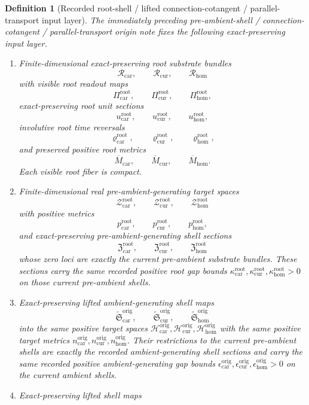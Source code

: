 \documentclass[11pt]{article}
\newcommand{\TensorOriginTarget}{\mathcal H_{\mathrm{car}}^{\mathrm{orig}}}
\newcommand{\CurOriginTarget}{\mathcal H_{\mathrm{cur}}^{\mathrm{orig}}}
\newcommand{\HomOriginTarget}{\mathcal H_{\mathrm{hom}}^{\mathrm{orig}}}
\newcommand{\TensorOriginTargetMetric}{n_{\mathrm{car}}^{\mathrm{orig}}}
\newcommand{\CurOriginTargetMetric}{n_{\mathrm{cur}}^{\mathrm{orig}}}
\newcommand{\HomOriginTargetMetric}{n_{\mathrm{hom}}^{\mathrm{orig}}}
\newcommand{\TensorOriginGap}{\epsilon_{\mathrm{car}}^{\mathrm{orig}}}
\newcommand{\CurOriginGap}{\epsilon_{\mathrm{cur}}^{\mathrm{orig}}}
\newcommand{\HomOriginGap}{\epsilon_{\mathrm{hom}}^{\mathrm{orig}}}
\newcommand{\TensorRootSpace}{\mathcal R_{\mathrm{car}}}
\newcommand{\CurRootSpace}{\mathcal R_{\mathrm{cur}}}
\newcommand{\HomRootSpace}{\mathcal R_{\mathrm{hom}}}
\newcommand{\TensorRootRead}{\Pi_{\mathrm{car}}^{\mathrm{root}}}
\newcommand{\CurRootRead}{\Pi_{\mathrm{cur}}^{\mathrm{root}}}
\newcommand{\HomRootRead}{\Pi_{\mathrm{hom}}^{\mathrm{root}}}
\newcommand{\TensorRootUnit}{u_{\mathrm{car}}^{\mathrm{root}}}
\newcommand{\CurRootUnit}{u_{\mathrm{cur}}^{\mathrm{root}}}
\newcommand{\HomRootUnit}{u_{\mathrm{hom}}^{\mathrm{root}}}
\newcommand{\TensorRootTimeRev}{\varrho_{\mathrm{car}}^{\mathrm{root}}}
\newcommand{\CurRootTimeRev}{\varrho_{\mathrm{cur}}^{\mathrm{root}}}
\newcommand{\HomRootTimeRev}{\varrho_{\mathrm{hom}}^{\mathrm{root}}}
\newcommand{\TensorRootSpaceMetric}{\overline M_{\mathrm{car}}}
\newcommand{\CurRootSpaceMetric}{\overline M_{\mathrm{cur}}}
\newcommand{\HomRootSpaceMetric}{\overline M_{\mathrm{hom}}}
\newcommand{\TensorRootTarget}{\mathcal Z_{\mathrm{car}}^{\mathrm{root}}}
\newcommand{\CurRootTarget}{\mathcal Z_{\mathrm{cur}}^{\mathrm{root}}}
\newcommand{\HomRootTarget}{\mathcal Z_{\mathrm{hom}}^{\mathrm{root}}}
\newcommand{\TensorRootTargetMetric}{p_{\mathrm{car}}^{\mathrm{root}}}
\newcommand{\CurRootTargetMetric}{p_{\mathrm{cur}}^{\mathrm{root}}}
\newcommand{\HomRootTargetMetric}{p_{\mathrm{hom}}^{\mathrm{root}}}
\newcommand{\TensorRootSection}{\mathfrak Z_{\mathrm{car}}^{\mathrm{root}}}
\newcommand{\CurRootSection}{\mathfrak Z_{\mathrm{cur}}^{\mathrm{root}}}
\newcommand{\HomRootSection}{\mathfrak Z_{\mathrm{hom}}^{\mathrm{root}}}
\newcommand{\TensorRootGap}{\kappa_{\mathrm{car}}^{\mathrm{root}}}
\newcommand{\CurRootGap}{\kappa_{\mathrm{cur}}^{\mathrm{root}}}
\newcommand{\HomRootGap}{\kappa_{\mathrm{hom}}^{\mathrm{root}}}
\newcommand{\TensorLiftedAmbientSection}{\widetilde{\mathfrak S}_{\mathrm{car}}^{\mathrm{orig}}}
\newcommand{\CurLiftedAmbientSection}{\widetilde{\mathfrak S}_{\mathrm{cur}}^{\mathrm{orig}}}
\newcommand{\HomLiftedAmbientSection}{\widetilde{\mathfrak S}_{\mathrm{hom}}^{\mathrm{orig}}}
\newtheorem{definition}{Definition}
\begin{document}
\begin{definition}[Recorded root-shell / lifted connection-cotangent / parallel-transport input layer]
\label{def:recorded_root_layer}
The immediately preceding pre-ambient-shell / connection-cotangent / parallel-transport origin note fixes the following exact-preserving input layer.
\begin{enumerate}
    \item Finite-dimensional exact-preserving root substrate bundles
    \[
    \TensorRootSpace,\qquad
    \CurRootSpace,\qquad
    \HomRootSpace
    \]
    with visible root readout maps
    \[
    \TensorRootRead,\qquad
    \CurRootRead,\qquad
    \HomRootRead,
    \]
    exact-preserving root unit sections
    \[
    \TensorRootUnit,\qquad
    \CurRootUnit,\qquad
    \HomRootUnit,
    \]
    involutive root time reversals
    \[
    \TensorRootTimeRev,\qquad
    \CurRootTimeRev,\qquad
    \HomRootTimeRev,
    \]
    and preserved positive root metrics
    \[
    \TensorRootSpaceMetric,\qquad
    \CurRootSpaceMetric,\qquad
    \HomRootSpaceMetric.
    \]
    Each visible root fiber is compact.
    \item Finite-dimensional real pre-ambient-generating target spaces
    \[
    \TensorRootTarget,\qquad
    \CurRootTarget,\qquad
    \HomRootTarget
    \]
    with positive metrics
    \[
    \TensorRootTargetMetric,\qquad
    \CurRootTargetMetric,\qquad
    \HomRootTargetMetric,
    \]
    and exact-preserving pre-ambient-generating shell sections
    \[
    \TensorRootSection,\qquad
    \CurRootSection,\qquad
    \HomRootSection
    \]
    whose zero loci are exactly the current pre-ambient substrate bundles. These sections carry the same recorded positive root gap bounds \(\TensorRootGap,\CurRootGap,\HomRootGap>0\) on those current pre-ambient shells.
    \item Exact-preserving lifted ambient-generating shell maps
    \[
    \TensorLiftedAmbientSection,\qquad
    \CurLiftedAmbientSection,\qquad
    \HomLiftedAmbientSection
    \]
    into the same positive target spaces \(\TensorOriginTarget,\CurOriginTarget,\HomOriginTarget\) with the same positive target metrics \(\TensorOriginTargetMetric,\CurOriginTargetMetric,\HomOriginTargetMetric\). Their restrictions to the current pre-ambient shells are exactly the recorded ambient-generating shell sections and carry the same recorded positive ambient-generating gap bounds \(\TensorOriginGap,\CurOriginGap,\HomOriginGap>0\) on the current ambient shells.
    \item Exact-preserving lifted shell maps

\end{enumerate}
\end{definition}
\end{document}
